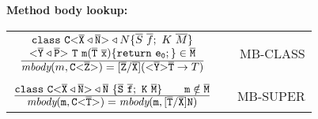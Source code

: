 {\begin{minipage}{\textwidth}
\begin{small}
  \textbf{Method body lookup:} \\[1em]
\begin{tabularx}{\textwidth}{cXr}
  $\frac{\displaystyle \begin{array}{c}
  \texttt{class}\ \mathtt{C {\tt <} \overline{\tt X} \triangleleft \overline{\tt N} {\tt >} }\triangleleft
             N\{ \overline{S} \ \overline{f}; \ K \ \overline{M} \} \\
  \mathtt{\mathtt{ {\tt <} \overline{\tt Y} \triangleleft \overline{\tt P} {\tt >} }\ T\ \texttt{m}(\overline{\tt T}\ \overline{\tt \mathtt{x}}) \{\texttt{return}\ \mathtt{e}_0;\}}
  \in \overline{\tt M}
  \end{array}}{\displaystyle 
  \textit{mbody}(m, \mathtt{C {\tt <} \overline{\tt Z} {\tt >} }) = [\overline{\tt Z} / \overline{\tt X}](\mathtt{ {\tt <} \overline{\tt Y} {\tt >} } \overline{\tt T} \to T)
  }$ & & MB-CLASS \\
  & & \\
  $\frac{\displaystyle 
  \mathtt{\texttt{class}\ \mathtt{C {\tt <} \overline{\tt X} \triangleleft \overline{\tt N} {\tt >} }\triangleleft
             \overline{\tt N}\ \{ \overline{S} \ \overline{f}; \ K \ \overline{M} \} \quad \quad m \notin \overline{\tt M}}
  }{\displaystyle 
  \mathtt{\textit{mbody}(m, \mathtt{C {\tt <} \overline{\tt T} {\tt >} }) = \textit{mbody}(m, [\overline{\tt T}/\overline{\tt X}]N)}
  }$ & & MB-SUPER \\
\end{tabularx}
\end{small}
\end{minipage}
}

\medskip






